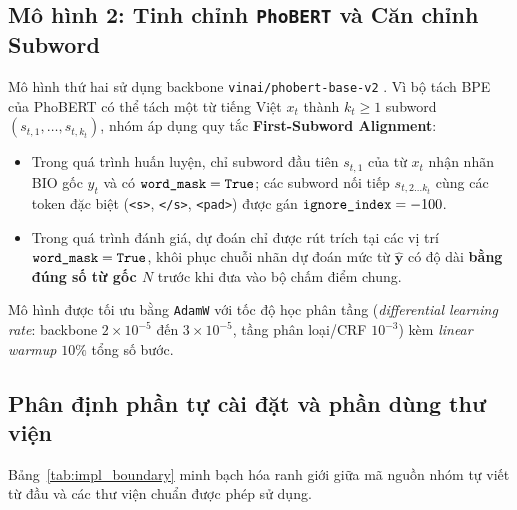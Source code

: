 \documentclass[11pt,a4paper,twocolumn]{article}
\begin{document}
\subsection{Mô hình 2: Tinh chỉnh \texttt{PhoBERT} và Căn chỉnh Subword}
\label{sec:method_phobert}
Mô hình thứ hai sử dụng backbone \texttt{vinai/phobert-base-v2} \citep{nguyen-nguyen-2020-phobert}. Vì bộ tách BPE của PhoBERT có thể tách một từ tiếng Việt $x_t$ thành $k_t \ge 1$ subword $(s_{t,1}, \dots, s_{t,k_t})$, nhóm áp dụng quy tắc \textbf{First-Subword Alignment}:
\begin{itemize}
  \item Trong quá trình huấn luyện, chỉ subword đầu tiên $s_{t,1}$ của từ $x_t$ nhận nhãn BIO gốc $y_t$ và có $\text{\texttt{word\_mask}} = \text{\texttt{True}}$; các subword nối tiếp $s_{t,2\dots k_t}$ cùng các token đặc biệt (\texttt{<s>}, \texttt{</s>}, \texttt{<pad>}) được gán $\text{\texttt{ignore\_index}} = -100$.
  \item Trong quá trình đánh giá, dự đoán chỉ được rút trích tại các vị trí $\text{\texttt{word\_mask}} = \text{\texttt{True}}$, khôi phục chuỗi nhãn dự đoán mức từ $\hat{\mathbf{y}}$ có độ dài \textbf{bằng đúng số từ gốc $N$} trước khi đưa vào bộ chấm điểm chung.
\end{itemize}
Mô hình được tối ưu bằng \texttt{AdamW} với tốc độ học phân tầng (\textit{differential learning rate}: backbone $2\times 10^{-5}$ đến $3\times 10^{-5}$, tầng phân loại/CRF $10^{-3}$) kèm \textit{linear warmup} $10\%$ tổng số bước.

\subsection{Phân định phần tự cài đặt và phần dùng thư viện}
Bảng~\ref{tab:impl_boundary} minh bạch hóa ranh giới giữa mã nguồn nhóm tự viết từ đầu và các thư viện chuẩn được phép sử dụng.
\end{document}
